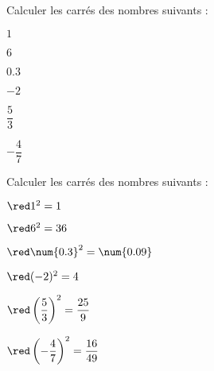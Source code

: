 \begin{exercice*}
    Calculer les carrés des nombres suivants :
    \begin{multicols}{2}
        \begin{enumerate}
            \begin{spacing}{1.5}
                \item $1$
                \item $6$
                \item $\num{0.3}$
                \item $-2$
                \item $\dfrac{5}{3}$
                \item $-\dfrac{4}{7}$
            \end{spacing}
        \end{enumerate}
    \end{multicols}

\end{exercice*}
\begin{corrige}
    Calculer les carrés des nombres suivants :
    \begin{multicols}{2}
        \begin{enumerate}
            \begin{spacing}{1.5}
                \item ${\red 1^2 = 1}$
                \item ${\red 6^2 = 36}$
                \item ${\red \num{0.3}^2 = \num{0.09}}$
                \item ${\red (-2)^2 = 4}$
                \item ${\red \left(\dfrac{5}{3}\right)^2 = \dfrac{25}{9}}$
                \item ${\red \left(-\dfrac{4}{7}\right)^2 = \dfrac{16}{49}}$
            \end{spacing}
        \end{enumerate}
    \end{multicols}
\end{corrige}

